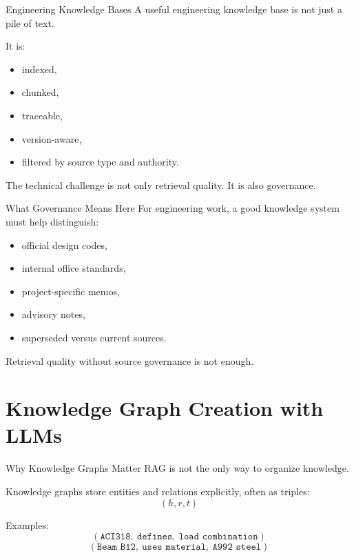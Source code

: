 \documentclass[12pt]{beamer}
\begin{document}
\begin{frame}{Engineering Knowledge Bases}
  A useful engineering knowledge base is not just a pile of text.

  It is:
  \begin{itemize}
    \item indexed,
    \item chunked,
    \item traceable,
    \item version-aware,
    \item filtered by source type and authority.
  \end{itemize}

  The technical challenge is not only retrieval quality. It is also governance.
\end{frame}

\begin{frame}{What Governance Means Here}
  For engineering work, a good knowledge system must help distinguish:
  \begin{itemize}
    \item official design codes,
    \item internal office standards,
    \item project-specific memos,
    \item advisory notes,
    \item superseded versus current sources.
  \end{itemize}

  Retrieval quality without source governance is not enough.
\end{frame}

\section{Knowledge Graph Creation with LLMs}

\begin{frame}{Why Knowledge Graphs Matter}
  RAG is not the only way to organize knowledge.

  Knowledge graphs store entities and relations explicitly, often as triples:
  \[
    (h,r,t)
  \]

  Examples:
  \[
    (\texttt{ACI318},\ \texttt{defines},\ \texttt{load\ combination})
  \]
  \[
    (\texttt{Beam\ B12},\ \texttt{uses\ material},\ \texttt{A992\ steel})
  \]
\end{frame}
\end{document}
